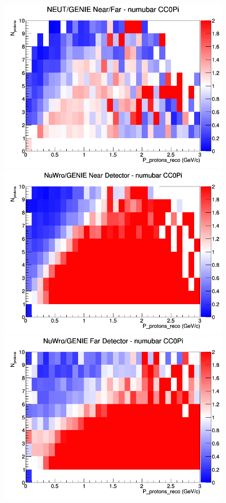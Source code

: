 \documentclass[12pt]{article}
\begin{document}
\begin{figure}[h]
\endminipage
{}
\includegraphics[width=\linewidth]{eff_N_P/GAr/protons/ratios/CC0Pi_NEUT_GENIE_numubar_NF_N_P.png}
\endminipage
\newline
{}
\includegraphics[width=\linewidth]{eff_N_P/GAr/protons/ratios/CC0Pi_NuWro_GENIE_numubar_near_N_P.png}
\endminipage
{}
\includegraphics[width=\linewidth]{eff_N_P/GAr/protons/ratios/CC0Pi_NuWro_GENIE_numubar_far_N_P.png}

\end{figure}
\end{document}
